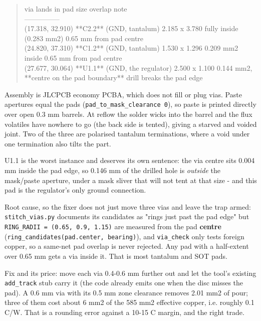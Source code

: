 \documentclass[11pt,a4paper]{article}
\begin{document}
\begin{quote}\small\ttfamily\raggedright
\textbar{} via \textbar{} lands in \textbar{} pad size \textbar{} overlap \textbar{} note \textbar{}\\
\textbar{}---\textbar{}---\textbar{}---\textbar{}---\textbar{}---\textbar{}\\
\textbar{} (17.318, 32.910) \textbar{} {*}{*}C2.2{*}{*} (GND, tantalum) \textbar{} 2.185 x 3.780 \textbar{} fully inside (0.283 mm2) \textbar{} 0.65 mm from pad centre \textbar{}\\
\textbar{} (24.820, 37.310) \textbar{} {*}{*}C1.2{*}{*} (GND, tantalum) \textbar{} 1.530 x 1.296 \textbar{} 0.209 mm2 inside \textbar{} 0.65 mm from pad centre \textbar{}\\
\textbar{} (27.677, 30.064) \textbar{} {*}{*}U1.1{*}{*} (GND, the regulator) \textbar{} 2.500 x 1.100 \textbar{} 0.144 mm2, {*}{*}centre on the pad boundary{*}{*} \textbar{} drill breaks the pad edge \textbar{}
\end{quote}
Assembly is JLCPCB economy PCBA, which does not fill or plug vias. Paste apertures equal the pads (\texttt{pad\_to\_mask\_clearance 0}), so paste is printed directly over open 0.3 mm barrels. At reflow the solder wicks into the barrel and the flux volatiles have nowhere to go (the back side is tented), giving a starved and voided joint. Two of the three are polarised tantalum terminations, where a void under one termination also tilts the part.

U1.1 is the worst instance and deserves its own sentence: the via centre sits 0.004 mm inside the pad edge, so 0.146 mm of the drilled hole is \emph{outside} the mask/paste aperture, under a mask sliver that will not tent at that size - and this pad is the regulator's only ground connection.

Root cause, so the fixer does not just move three vias and leave the trap armed: \texttt{stitch\_vias.py} documents its candidates as "rings just past the pad edge" but \texttt{RING\_RADII = (0.65, 0.9, 1.15)} are measured from the pad \textbf{centre} (\texttt{ring\_candidates(pad.center, bearing)}), and \texttt{via\_check} only tests foreign copper, so a same-net pad overlap is never rejected. Any pad with a half-extent over 0.65 mm gets a via inside it. That is most tantalum and SOT pads.

Fix and its price: move each via 0.4-0.6 mm further out and let the tool's existing \texttt{add\_track} stub carry it (the code already emits one when the disc misses the pad). A 0.6 mm via with its 0.5 mm zone clearance removes 2.01 mm2 of pour; three of them cost about 6 mm2 of the 585 mm2 effective copper, i.e. roughly 0.1 C/W. That is a rounding error against a 10-15 C margin, and the right trade.
\end{document}
